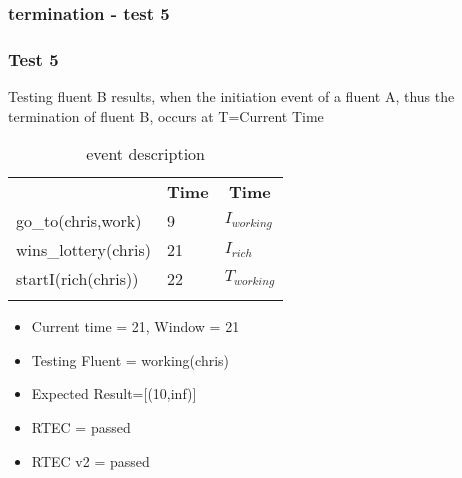 \documentclass[8pt]{beamer}
\begin{document}
\begin{frame}
    \frametitle{termination - test 5}
    \subsubsection{Test 5}
    \small
    Testing fluent B results, when the initiation event of a fluent A, thus the termination of fluent B, occurs at T=Current Time\linebreak
    \begin{minipage}{0.48\linewidth}
        \begin{table}[t!]
            \caption{event description}
            \begin{center}

                \begin{tabular}{lll}
                    \hline\noalign{\smallskip}
                    \multicolumn{1}{l}{\textbf{Event}} & \multicolumn{1}{c}{\textbf{Time}}  & \multicolumn{1}{c}{\textbf{Time}}  \\
                    go\_to(chris,work)&9&$I_{working}$\\
                    wins\_lottery(chris)&21&$I_{rich}$\\
                    startI(rich(chris))&22&$T_{working}$\\
                    \noalign{\smallskip}
                    \hline
                \end{tabular}
            \end{center}
        \end{table}
        \begin{itemize}
            \item Current time = 21, Window = 21
            \item Testing Fluent = working(chris)
            \item Expected Result=[(10,inf)]
            \item RTEC = passed
            \item RTEC v2 = passed
        \end{itemize}
    \end{minipage}
    \begin{minipage}{0.48\linewidth}


\end{minipage}
\end{frame}
\end{document}
